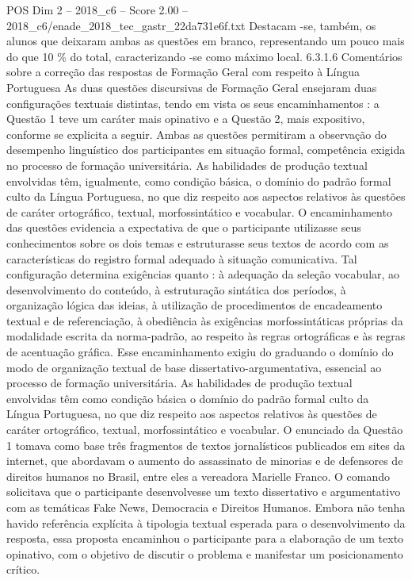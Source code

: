 \begin{textsample}{POS Dim 2 – 2018\_c6 – Score 2.00 – 2018\_c6/enade\_2018\_tec\_gastr\_22da731e6f.txt}
Destacam -se, também, os alunos que deixaram ambas as questões em branco, representando um pouco mais do que 10 \% do total, caracterizando -se como máximo local. 6.3.1.6 Comentários sobre a correção das respostas de Formação Geral com respeito à Língua Portuguesa As duas questões discursivas de Formação Geral ensejaram duas configurações textuais distintas, tendo em vista os seus encaminhamentos : a Questão 1 teve um caráter mais opinativo e a Questão 2, mais expositivo, conforme se explicita a seguir.
Ambas as questões permitiram a observação do desempenho linguístico dos participantes em situação formal, competência exigida no processo de formação universitária.
As habilidades de produção textual envolvidas têm, igualmente, como condição básica, o domínio do padrão formal culto da Língua Portuguesa, no que diz respeito aos aspectos relativos às questões de caráter ortográfico, textual, morfossintático e vocabular.
O encaminhamento das questões evidencia a expectativa de que o participante utilizasse seus conhecimentos sobre os dois temas e estruturasse seus textos de acordo com as características do registro formal adequado à situação comunicativa.
Tal configuração determina exigências quanto : à adequação da seleção vocabular, ao desenvolvimento do conteúdo, à estruturação sintática dos períodos, à organização lógica das ideias, à utilização de procedimentos de encadeamento textual e de referenciação, à obediência às exigências morfossintáticas próprias da modalidade escrita da norma-padrão, ao respeito às regras ortográficas e às regras de acentuação gráfica.
Esse encaminhamento exigiu do graduando o domínio do modo de organização textual de base dissertativo-argumentativa, essencial ao processo de formação universitária.
As habilidades de produção textual envolvidas têm como condição básica o domínio do padrão formal culto da Língua Portuguesa, no que diz respeito aos aspectos relativos às questões de caráter ortográfico, textual, morfossintático e vocabular.
O enunciado da Questão 1 tomava como base três fragmentos de textos jornalísticos publicados em sites da internet, que abordavam o aumento do assassinato de minorias e de defensores de direitos humanos no Brasil, entre eles a vereadora Marielle Franco.
O comando solicitava que o participante desenvolvesse um texto dissertativo e argumentativo com as temáticas Fake News, Democracia e Direitos Humanos.
Embora não tenha havido referência explícita à tipologia textual esperada para o desenvolvimento da resposta, essa proposta encaminhou o participante para a elaboração de um texto opinativo, com o objetivo de discutir o problema e manifestar um posicionamento crítico.

\end{textsample}
